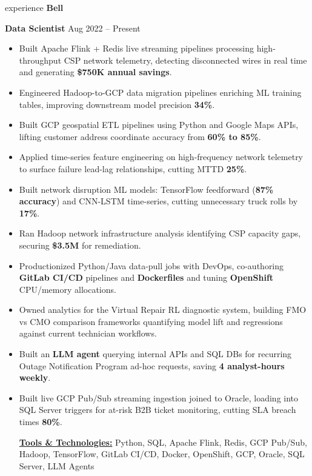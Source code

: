 \documentclass[25pt]{resume}
\begin{document}
\begin{ResumeSection}{experience}
    \textbf{\fontsize{13pt}{15pt}\selectfont Bell }

    \textbf{Data Scientist} \hfill Aug 2022 -- Present
    \begin{itemize}
        \item Built Apache Flink + Redis live streaming pipelines processing high-throughput CSP network telemetry, detecting disconnected wires in real time and generating \textbf{\$750K annual savings}.
        \item Engineered Hadoop-to-GCP data migration pipelines enriching ML training tables, improving downstream model precision \textbf{34\%}.
        \item Built GCP geospatial ETL pipelines using Python and Google Maps APIs, lifting customer address coordinate accuracy from \textbf{60\% to 85\%}.
        \item Applied time-series feature engineering on high-frequency network telemetry to surface failure lead-lag relationships, cutting MTTD \textbf{25\%}.
        \item Built network disruption ML models: TensorFlow feedforward (\textbf{87\% accuracy}) and CNN-LSTM time-series, cutting unnecessary truck rolls by \textbf{17\%}.
        \item Ran Hadoop network infrastructure analysis identifying CSP capacity gaps, securing \textbf{\$3.5M} for remediation.
        \item Productionized Python/Java data-pull jobs with DevOps, co-authoring \textbf{GitLab CI/CD} pipelines and \textbf{Dockerfiles} and tuning \textbf{OpenShift} CPU/memory allocations.
        \item Owned analytics for the Virtual Repair RL diagnostic system, building FMO vs CMO comparison frameworks quantifying model lift and regressions against current technician workflows.
        \item Built an \textbf{LLM agent} querying internal APIs and SQL DBs for recurring Outage Notification Program ad-hoc requests, saving \textbf{4 analyst-hours weekly}.
        \item Built live GCP Pub/Sub streaming ingestion joined to Oracle, loading into SQL Server triggers for at-risk B2B ticket monitoring, cutting SLA breach times \textbf{80\%}.

        \vspace{0.3\baselineskip}
        {\underline{\textbf{Tools \& Technologies:}} Python, SQL, Apache Flink, Redis, GCP Pub/Sub, Hadoop, TensorFlow, GitLab CI/CD, Docker, OpenShift, GCP, Oracle, SQL Server, LLM Agents}
    \end{itemize}
    \vspace{0.5\baselineskip}


\end{ResumeSection}
\end{document}
